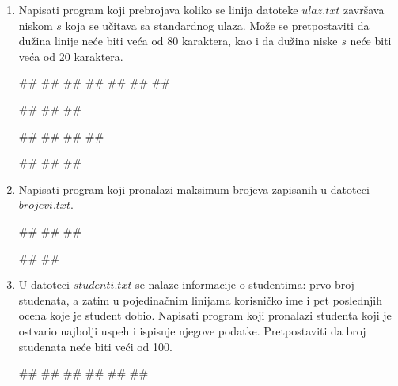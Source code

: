 \begin{enumerate}
\item Napisati program koji prebrojava koliko se linija datoteke $ulaz.txt$ završava niskom $s$ koja se učitava sa standardnog ulaza. Može se pretpostaviti da dužina linije neće biti veća od 80 karaktera, kao i da dužina niske $s$ neće biti veća od 20 karaktera.\\
\begin{miditest}
\begin{upotreba}{1}
##
##
##
##
##
##
##

#\naslovInt#
##
##
\end{upotreba}
\end{miditest}
\begin{miditest}
\begin{upotreba}{2}
##
##
##
##

#\naslovInt#
##
##
\end{upotreba}
\end{miditest}

\item Napisati program koji pronalazi maksimum brojeva zapisanih u datoteci $brojevi.txt$. \\
\begin{miditest}
\begin{upotreba}{1}
##
##
##

#\naslovIzlaz#
##
\end{upotreba}
\end{miditest}

\item U datoteci $studenti.txt$ se nalaze informacije o studentima: prvo broj studenata, a zatim u pojedinačnim linijama korisničko ime i pet poslednjih ocena koje je student dobio. Napisati program koji pronalazi studenta koji je ostvario najbolji uspeh i ispisuje njegove podatke. Pretpostaviti da broj studenata neće biti veći od 100.\\
\begin{miditest}
\begin{upotreba}{1}
##
##
##
##
##
##


\end{upotreba}
\end{miditest}
\end{enumerate}
